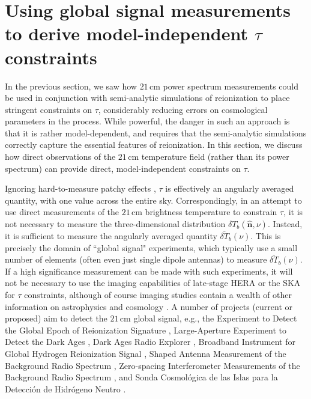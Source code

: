 \documentclass[twocolumn,aps,prd,nofootinbib,showpacs,superscriptaddress]{revtex4-1}
\begin{document}
\section{Using global signal measurements to derive model-independent $\tau$ constraints}
\label{sec:GlobalSig}

In the previous section, we saw how $21\,\textrm{cm}$ power spectrum measurements could be used in conjunction with semi-analytic simulations of reionization to place stringent constraints on $\tau$, considerably reducing errors on cosmological parameters in the process. While powerful, the danger in such an approach is that it is rather model-dependent, and requires that the semi-analytic simulations correctly capture the essential features of reionization. In this section, we discuss how direct observations of the $21\,\textrm{cm}$ temperature field (rather than its power spectrum) can provide direct, model-independent constraints on $\tau$.

Ignoring hard-to-measure patchy effects \cite{dvorkin_et_al2009,su_et_al2011}, $\tau$ is effectively an angularly averaged quantity, with one value across the entire sky. Correspondingly, in an attempt to use direct measurements of the $21\,\textrm{cm}$ brightness temperature to constrain $\tau$, it is not necessary to measure the three-dimensional distribution $\delta T_b (\mathbf{\hat{n}}, \nu)$. Instead, it is sufficient to measure the angularly averaged quantity $\overline{\delta T}_b (\nu)$. This is precisely the domain of ``global signal" experiments, which typically use a small number of elements (often even just single dipole antennas) to measure $\overline{\delta T}_b (\nu)$. If a high significance measurement can be made with such experiments, it will not be necessary to use the imaging capabilities of late-stage HERA or the SKA for $\tau$ constraints, although of course imaging studies contain a wealth of other information on astrophysics and cosmology \cite{zaroubi_et_al2012,beardsley_et_al2015,mellema_et_al2015}. A number of projects (current or proposed) aim to detect the $21\,\textrm{cm}$ global signal, e.g., the Experiment to Detect the Global Epoch of Reionization Signature \citep{bowman2010}, Large-Aperture Experiment to Detect the Dark Ages \citep{greenhill2012}, Dark Ages Radio Explorer \citep{burns2012}, Broadband Instrument for Global Hydrogen Reionization Signal \cite{Sokolowski_et_al2015}, Shaped Antenna Measurement of the Background Radio Spectrum \cite{patra_et_al2013}, Zero-spacing Interferometer Measurements of the Background Radio Spectrum \cite{mahesh_et_al2014}, and Sonda Cosmol\'{o}gica de las Islas para la Detecci\'{o}n de Hidr\'{o}geno Neutro \citep{voytek2014}.
\end{document}
